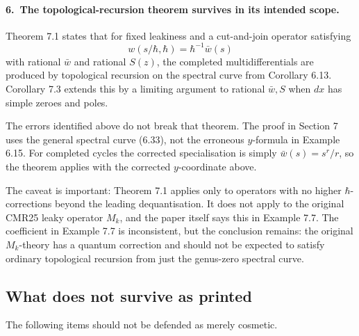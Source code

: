 \documentclass[11pt]{article}
\begin{document}
\paragraph{6.\ The topological-recursion theorem survives in its intended scope.}
Theorem 7.1 states that for fixed leakiness and a cut-and-join operator satisfying
\[
   w(s/\hbar,\hbar) = \hbar^{-1}\bar w(s)
\]
with rational $\bar w$ and rational $S(z)$, the completed multidifferentials are produced by topological recursion on the spectral curve from Corollary 6.13.  Corollary 7.3 extends this by a limiting argument to rational $\bar w, S$ when $dx$ has simple zeroes and poles.

The errors identified above do not break that theorem.  The proof in Section 7 uses the general spectral curve (6.33), not the erroneous $y$-formula in Example 6.15.  For completed cycles the corrected specialisation is simply $\bar w(s) = s^r/r$, so the theorem applies with the corrected $y$-coordinate above.

The caveat is important: Theorem 7.1 applies only to operators with no higher $\hbar$-corrections beyond the leading dequantisation.  It does not apply to the original CMR25 leaky operator $M_k$, and the paper itself says this in Example 7.7.  The coefficient in Example 7.7 is inconsistent, but the conclusion remains: the original $M_k$-theory has a quantum correction and should not be expected to satisfy ordinary topological recursion from just the genus-zero spectral curve.

\subsection*{What does not survive as printed}

The following items should not be defended as merely cosmetic.
\end{document}
